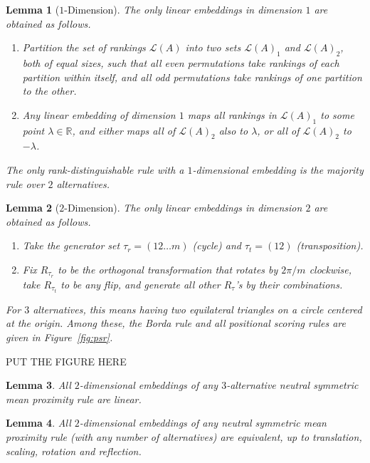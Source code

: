 \documentclass[10pt,letterpaper]{article}
\newcommand{\calL}{{\mathcal{L}}}
\newcommand{\rank}{{\calL(A)}}
\newtheorem{lemma}{Lemma}
\begin{document}
\begin{lemma}[$1$-Dimension]
The only linear embeddings in dimension $1$ are obtained as follows. 
\begin{enumerate}
\item Partition the set of rankings $\rank$ into two sets $\rank_1$ and $\rank_2$, both of equal sizes, such that all even permutations take rankings of each partition within itself, and all odd permutations take rankings of one partition to the other. 
\item Any linear embedding of dimension $1$ maps all rankings in $\rank_1$ to some point $\lambda \in \mathbb{R}$, and either maps all of $\rank_2$ also to $\lambda$, or all of $\rank_2$ to $-\lambda$. 
\end{enumerate}
The only rank-distinguishable rule with a $1$-dimensional embedding is the majority rule over $2$ alternatives.
\end{lemma}

\begin{lemma}[$2$-Dimension]
The only linear embeddings in dimension $2$ are obtained as follows.
\begin{enumerate}
\item Take the generator set $\tau_{r} = (1 2 \ldots m)$ (cycle) and $\tau_{t} = (1 2)$ (transposition). 
\item Fix $R_{\tau_{r}}$ to be the orthogonal transformation that rotates by $2\pi / m$ clockwise, take $R_{\tau_{t}}$ to be any flip, and generate all other $R_{\tau}$'s by their combinations. 
\end{enumerate}
For $3$ alternatives, this means having two equilateral triangles on a circle centered at the origin. Among these, the Borda rule and all positional scoring rules are given in Figure~\ref{fig:psr}.
\end{lemma}

PUT THE FIGURE HERE

\begin{lemma}
All $2$-dimensional embeddings of any $3$-alternative neutral symmetric mean proximity rule are linear.
\end{lemma}

\begin{lemma}
All $2$-dimensional embeddings of any neutral symmetric mean proximity rule (with any number of alternatives) are equivalent, up to translation, scaling, rotation and reflection.
\end{lemma}

\end{document}
